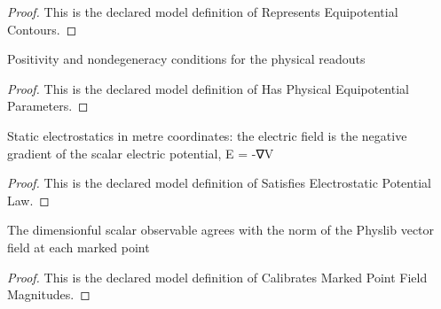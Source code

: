 \begin{proof}
  This is the declared model definition of Represents Equipotential Contours.
\end{proof}
\begin{definition}
  \label{def:physics:phyx-mini-0876:phyxminiproblems-problemphyxmini0876-hasphysicalequipotentialparameters}
  Positivity and nondegeneracy conditions for the physical readouts
\end{definition}
\begin{proof}
  This is the declared model definition of Has Physical Equipotential Parameters.
\end{proof}
\begin{definition}
  \label{def:physics:phyx-mini-0876:phyxminiproblems-problemphyxmini0876-satisfieselectrostaticpotentiallaw}
  Static electrostatics in metre coordinates: the electric field is the negative gradient of the scalar electric potential, E = -∇V
\end{definition}
\begin{proof}
  This is the declared model definition of Satisfies Electrostatic Potential Law.
\end{proof}
\begin{definition}
  \label{def:physics:phyx-mini-0876:phyxminiproblems-problemphyxmini0876-calibratesmarkedpointfieldmagnitudes}
  The dimensionful scalar observable agrees with the norm of the Physlib vector field at each marked point
\end{definition}
\begin{proof}
  This is the declared model definition of Calibrates Marked Point Field Magnitudes.
\end{proof}

